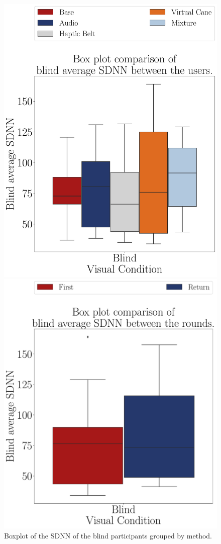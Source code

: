 \begin{figure}[!htb]
    \centering
    \begin{minipage}{0.45\textwidth}
        \centering
        \includegraphics[width = 0.8\linewidth]{Resultados/ECG/Figuras/pdf/boxplot_ecg_sdnn_blind_scene.pdf}
        \caption{Boxplot of the SDNN of the blind participants grouped by method.}
        \label{fig:boxplot_ecg_sdnn_blind_scene}
    \end{minipage}
    \begin{minipage}{0.075\textwidth}
        \hfill
    \end{minipage}
    \begin{minipage}{0.45\textwidth}
        \centering
        \includegraphics[width = 0.8\linewidth]{Resultados/ECG/Figuras/pdf/boxplot_ecg_sdnn_blind_rounds.pdf}

\end{minipage}
\end{figure}
